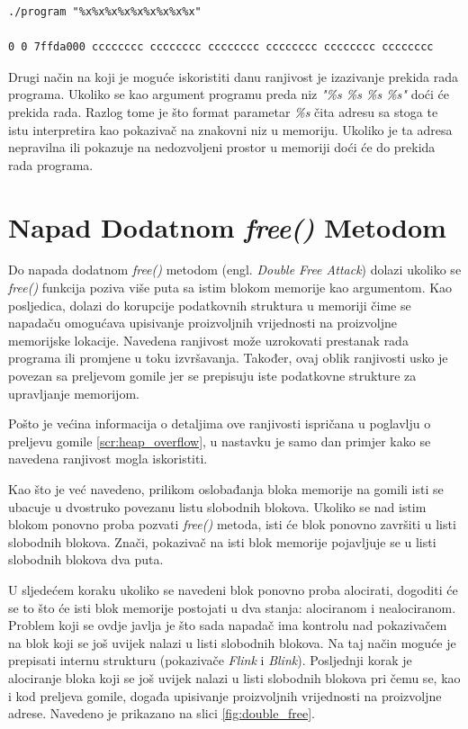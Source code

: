 \documentclass[times, utf8, diplomski, numeric]{fer}
\begin{document}
\begin{lstlisting}[frame=single, caption=Primjer rada program, label={lst:formatStringStackRead}]
./program "%x%x%x%x%x%x%x%x%x"

0 0 7ffda000 cccccccc cccccccc cccccccc cccccccc cccccccc cccccccc
\end{lstlisting}

Drugi način na koji je moguće iskoristiti danu ranjivost je
izazivanje prekida rada programa. Ukoliko se kao argument
programu preda niz \emph{"\%s \%s \%s \%s"} doći će prekida rada.
Razlog tome je što format parametar \emph{\%s} čita adresu sa
stoga te istu interpretira kao pokazivač na znakovni niz u
memoriju. Ukoliko je ta adresa nepravilna ili pokazuje na
nedozvoljeni prostor u memoriji doći će do prekida rada programa.

\section{Napad Dodatnom \emph{free()} Metodom}

Do napada dodatnom \emph{free()} metodom (engl. \emph{Double Free
Attack}) dolazi ukoliko se \emph{free()} funkcija poziva više
puta sa istim blokom memorije kao argumentom. Kao posljedica,
dolazi do korupcije podatkovnih struktura u memoriji čime se
napadaču omogućava upisivanje proizvoljnih vrijednosti na
proizvoljne memorijske lokacije. Navedena ranjivost može
uzrokovati prestanak rada programa ili promjene u toku
izvršavanja. Također, ovaj oblik ranjivosti usko je povezan sa
preljevom gomile jer se prepisuju iste podatkovne strukture za
upravljanje memorijom.

Pošto je većina informacija o detaljima ove ranjivosti ispričana
u poglavlju o preljevu gomile \ref{scr:heap_overflow}, u nastavku
je samo dan primjer kako se navedena ranjivost mogla iskoristiti.

Kao što je već navedeno, prilikom oslobađanja bloka memorije na
gomili isti se ubacuje u dvostruko povezanu listu slobodnih
blokova. Ukoliko se nad istim blokom ponovno proba pozvati
\emph{free()} metoda, isti će blok ponovno završiti u listi
slobodnih blokova. Znači, pokazivač na isti blok memorije
pojavljuje se u listi slobodnih blokova dva puta.

U sljedećem koraku ukoliko se navedeni blok ponovno proba
alocirati, dogoditi će se to što će isti blok memorije postojati
u dva stanja: alociranom i nealociranom. Problem koji se ovdje
javlja je što sada napadač ima kontrolu nad pokazivačem na blok
koji se još uvijek nalazi u listi slobodnih blokova. Na taj način
moguće je prepisati internu strukturu (pokazivače \emph{Flink} i
\emph{Blink}). Posljednji korak je alociranje bloka koji se još
uvijek nalazi u listi slobodnih blokova pri čemu se, kao i kod
preljeva gomile, događa upisivanje proizvoljnih vrijednosti na
proizvoljne adrese. Navedeno je prikazano na slici
\ref{fig:double_free}.
\end{document}

